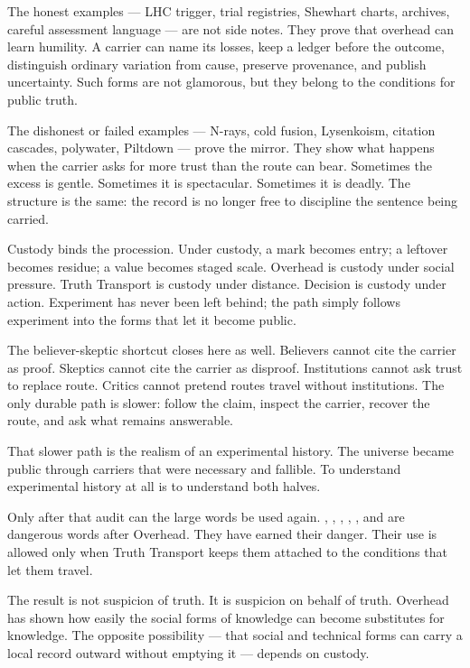 \begin{movementclose}
The honest examples --- LHC trigger, trial registries, Shewhart charts,
archives, careful assessment language --- are not side notes. They prove
that overhead can learn humility. A carrier can name its losses, keep a
ledger before the outcome, distinguish ordinary variation from cause,
preserve provenance, and publish uncertainty. Such forms are not glamorous,
but they belong to the conditions for public truth.

The dishonest or failed examples --- N-rays, cold fusion, Lysenkoism,
citation cascades, polywater, Piltdown --- prove the mirror. They show what
happens when the carrier asks for more trust than the route can bear.
Sometimes the excess is gentle. Sometimes it is spectacular. Sometimes it
is deadly. The structure is the same: the record is no longer free to
discipline the sentence being carried.

Custody binds the procession. Under custody, a mark becomes entry; a
leftover becomes residue; a value becomes staged scale. Overhead is
custody under social pressure. Truth Transport is custody under distance.
Decision is custody under action. Experiment has never been left behind;
the path simply follows experiment into the forms that let it become
public.

The believer-skeptic shortcut closes here as well. Believers cannot cite the
carrier as proof. Skeptics cannot cite the carrier as disproof. Institutions
cannot ask trust to replace route. Critics cannot pretend routes travel
without institutions. The only durable path is slower: follow the claim,
inspect the carrier, recover the route, and ask what remains answerable.

That slower path is the realism of an experimental history. The universe
became public through carriers that were necessary and fallible. To
understand experimental history at all is to understand both halves.

Only after that audit can the large words be used again. ,
, , , , and
 are dangerous words after Overhead. They have earned their
danger. Their use is allowed only when Truth Transport keeps them attached to the
conditions that let them travel.

The result is not suspicion of truth. It is suspicion on behalf of truth.
Overhead has shown how easily the social forms of knowledge can become
substitutes for knowledge. The opposite possibility --- that social and
technical forms can carry a local record outward without emptying it ---
depends on custody.


\end{movementclose}
